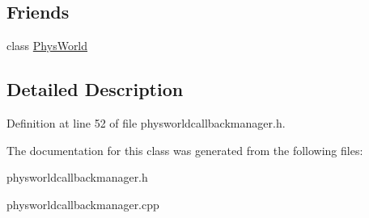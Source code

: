 \subsection*{Friends}
\begin{DoxyCompactItemize}
\item 
\hypertarget{classPhysWorldCallBackManager_a375fd37c70c941f0442997a60fdb05c7}{
class \hyperlink{classPhysWorldCallBackManager_a375fd37c70c941f0442997a60fdb05c7}{PhysWorld}}
\label{d4/d84/classPhysWorldCallBackManager_a375fd37c70c941f0442997a60fdb05c7}

\end{DoxyCompactItemize}


\subsection{Detailed Description}


Definition at line 52 of file physworldcallbackmanager.h.

The documentation for this class was generated from the following files:\begin{DoxyCompactItemize}
\item 
physworldcallbackmanager.h\item 
physworldcallbackmanager.cpp\end{DoxyCompactItemize}
